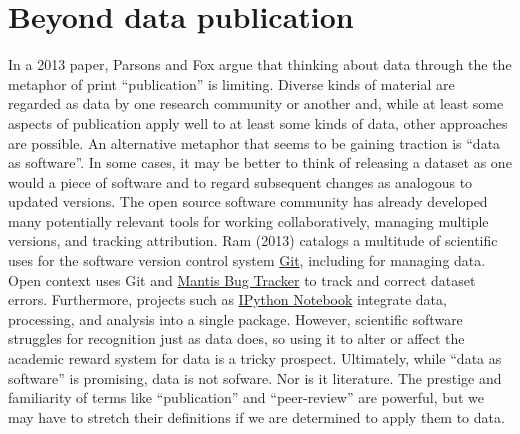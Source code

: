 \documentclass[10pt,twocolumn]{article}
\begin{document}
\section*{Beyond data publication}\label{beyond-data-publication}

In a 2013 paper\cite{parsons_is_2013}, Parsons and Fox argue that thinking about data through the the metaphor of print ``publication'' is limiting.
Diverse kinds of material are regarded as data by one research community or another and, while at least some aspects of publication apply well to at least some kinds of data, other approaches are possible. %
An alternative metaphor that seems to be gaining traction is ``data as software''\cite{schopf_treating_2012}.
In some cases, it may be better to think of releasing a dataset as one would a piece of software and to regard subsequent changes as analogous to updated versions.
The open source software community has already developed many potentially relevant tools for working collaboratively, managing multiple versions, and tracking attribution.
Ram (2013)\cite{ram_git_2013} catalogs a multitude of scientific uses for the software version control system \href{http://git-scm.com/}{Git}, including for managing data.
Open context uses Git and \href{http://www.mantisbt.org/}{Mantis Bug Tracker} to track and correct dataset errors.
Furthermore, projects such as \href{http://ipython.org/notebook}{IPython Notebook} integrate data, processing, and analysis into a single package.
However, scientific software struggles for recognition\cite{pradal_publishing_2013} just as data does, so using it to alter or affect the academic reward system for data is a tricky prospect.
Ultimately, while ``data as software'' is promising, data is not sofware. Nor is it literature.
The prestige and familiarity of terms like ``publication'' and ``peer-review'' are powerful, but we may have to stretch their definitions if we are determined to apply them to data.

{\small
}








\end{document}
